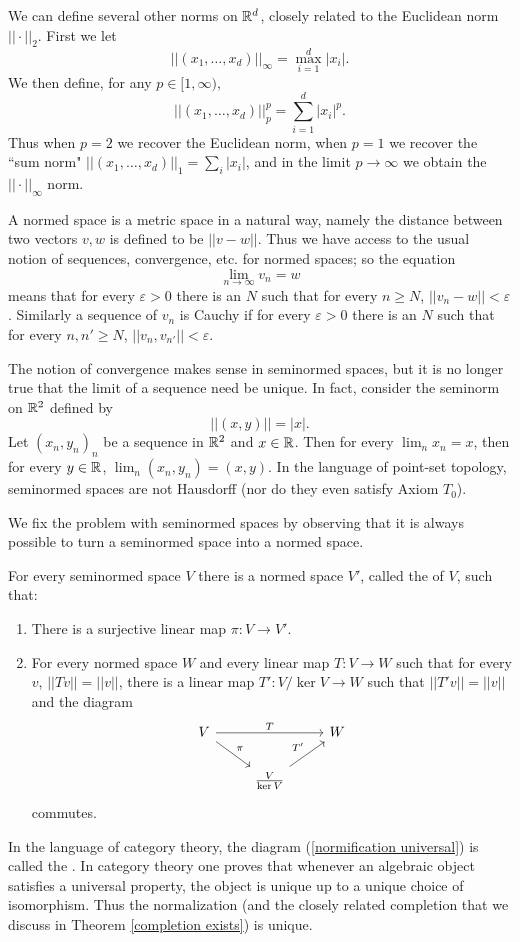 \begin{example}
We can define several other norms on $\mathbb{R}^d$, closely related to the Euclidean norm $||\cdot||_2$. First we let
$$||(x_1, \dots, x_d)||_\infty = \max_{i=1}^d |x_i|.$$
We then define, for any $p \in [1, \infty),$
$$||(x_1, \dots, x_d)||_p^p = \sum_{i=1}^d |x_i|^p.$$
Thus when $p = 2$ we recover the Euclidean norm, when $p = 1$ we recover the ``sum norm" $||(x_1, \dots, x_d)||_1 = \sum_i |x_i|$, and in the limit $p \to \infty$ we obtain the $||\cdot||_\infty$ norm.
\end{example}

A normed space is a metric space in a natural way, namely the distance between two vectors $v,w$ is defined to be $||v - w||$.
Thus we have access to the usual notion of sequences, convergence, etc. for normed spaces; so the equation
$$\lim_{n \to \infty} v_n = w$$
means that for every $\varepsilon > 0$ there is an $N$ such that for every $n \geq N$, $||v_n - w|| < \varepsilon$.
Similarly a sequence of $v_n$ is Cauchy if for every $\varepsilon > 0$ there is an $N$ such that for every $n, n' \geq N$, $||v_n, v_{n'}|| < \varepsilon$.

The notion of convergence makes sense in seminormed spaces, but it is no longer true that the limit of a sequence need be unique.
In fact, consider the seminorm on $\mathbb{R}^2$ defined by
$$||(x, y)|| = |x|.$$
Let $(x_n, y_n)_n$ be a sequence in $\mathbb{R}^2$ and $x \in \mathbb{R}$. Then for every $\lim_n x_n = x$, then for every $y \in \mathbb{R}$, $\lim_n (x_n, y_n) = (x, y)$.
In the language of point-set topology, seminormed spaces are not Hausdorff (nor do they even satisfy Axiom $T_0$).

We fix the problem with seminormed spaces by observing that it is always possible to turn a seminormed space into a normed space.
\begin{theorem}
\label{existence of normalization}
For every seminormed space $V$ there is a normed space $V'$, called the  of $V$, such that:
\begin{enumerate}
\item There is a surjective linear map $\pi: V \to V'$.
\item For every normed space $W$ and every linear map $T: V \to W$ such that for every $v$, $||Tv|| = ||v||$, there is a linear map $T': V/\ker V \to W$ such that $||T'v|| = ||v||$ and the diagram
\begin{equation}
\label{normification universal}
\begin{tikzcd}
V \arrow[rr,"T"] \arrow[dr,"\pi"] && W\\
& \frac{V}{\ker V} \arrow[ur,"T'"]
\end{tikzcd}
\end{equation}
commutes.
\end{enumerate}
\end{theorem}
In the language of category theory, the diagram (\ref{normification universal}) is called the .
In category theory one proves that whenever an algebraic object satisfies a universal property, the object is unique up to a unique choice of isomorphism.
Thus the normalization (and the closely related completion that we discuss in Theorem \ref{completion exists}) is unique.

